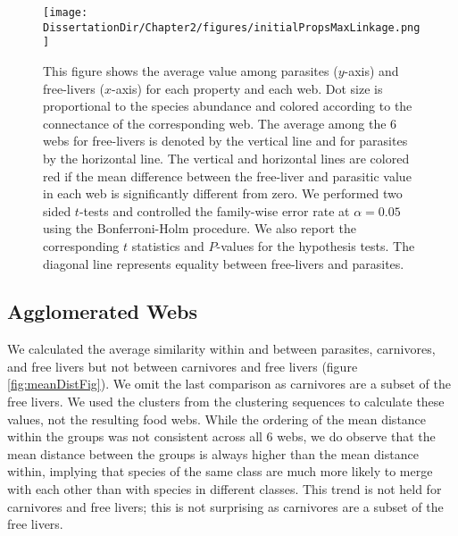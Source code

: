 \documentclass[../dissertation.tex]{subfiles}
\begin{document}
\begin{sidewaysfigure}       
    \centering
    {%
    }%
    \texttt{[image: \\DissertationDir/Chapter2/figures/initialPropsMaxLinkage.png]}

    \caption{This figure shows the average value among parasites ($y$-axis) and
        free-livers ($x$-axis) for each property and each web. Dot size is
        proportional to the species abundance and colored according to the
        connectance of the corresponding web.  The average among the 6 webs for
        free-livers is denoted by the vertical line and for parasites by the
        horizontal line. The vertical and horizontal lines are colored red if
        the mean difference between the free-liver and parasitic value in each
        web is significantly different from zero. We performed two sided
        $t$-tests and controlled the family-wise error rate at $\alpha=0.05$
        using the Bonferroni-Holm procedure. We also report the corresponding
        $t$ statistics and $P$-values for the hypothesis tests. The diagonal
        line represents equality between free-livers and
        parasites.\label{fig:initialNodalProperties}}
\end{sidewaysfigure}

\subsection{Agglomerated Webs}

We calculated the average similarity within and between parasites, carnivores,
and free livers but not between carnivores and free livers (figure
\ref{fig:meanDistFig}). We omit the last comparison as carnivores are a subset
of the free livers. We used the clusters from the clustering sequences to
calculate these values, not the resulting food webs. While the ordering of the
mean distance within the groups was not consistent across all 6 webs, we do
observe that the mean distance between the groups is always higher than the
mean distance within, implying that species of the same class are much more
likely to merge with each other than with species in different classes. This
trend is not held for carnivores and free livers; this is not surprising as
carnivores are a subset of the free livers.
\end{document}
